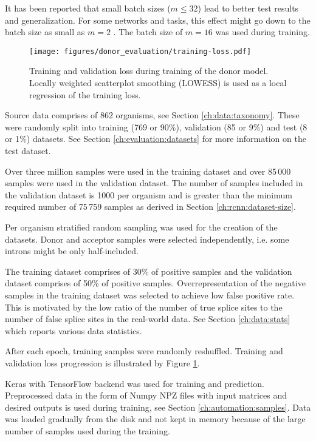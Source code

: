 It has been reported that small batch sizes ($m \le 32$) lead to better test
results and generalization. For some networks and tasks, this effect might go
down to the batch size as small as $m = 2$ \cite{masters2018revisitingb}. The
batch size of $m = 16$ was used during training.

\begin{figure}
  \centering
  \texttt{[image: figures/donor\_evaluation/training-loss.pdf]}
  \caption{Training and validation loss during training of the donor model.
    Locally weighted scatterplot smoothing (LOWESS) is used as a local
    regression of the training loss.}
  \label{fig:rcnn:training-loss}
\end{figure}

Source data comprises of 862 organisms, see Section \ref{ch:data:taxonomy}.
These were randomly split into training (769 or 90\%), validation (85 or 9\%)
and test (8 or 1\%) datasets. See Section \ref{ch:evaluation:datasets} for more
information on the test dataset.

Over three million samples were used in the training dataset and over 85\,000
samples were used in the validation dataset. The number of samples included in
the validation dataset is 1000 per organism and is greater than the minimum
required number of 75\,759 samples as derived in Section
\ref{ch:rcnn:dataset-size}.

Per organism stratified random sampling was used for the creation of the
datasets. Donor and acceptor samples were selected independently, i.e. some
introns might be only half-included.

The training dataset comprises of 30\% of positive samples and the validation
dataset comprises of 50\% of positive samples. Overrepresentation of the
negative samples in the training dataset was selected to achieve low false
positive rate. This is motivated by the low ratio of the number of true splice
sites to the number of false splice sites in the real-world data. See Section
\ref{ch:data:stats} which reports various data statistics.

After each epoch, training samples were randomly reshuffled.
Training and validation loss progression is illustrated by Figure
\ref{fig:rcnn:training-loss}.

Keras \cite{chollet2015keras} with TensorFlow \cite{abadi2016tensorflow}
backend was used for training and prediction. Preprocessed data in the form of
Numpy NPZ files with input matrices and desired outputs is used during
training, see Section \ref{ch:automation:samples}. Data was loaded gradually
from the disk and not kept in memory because of the large number of samples
used during the training.

